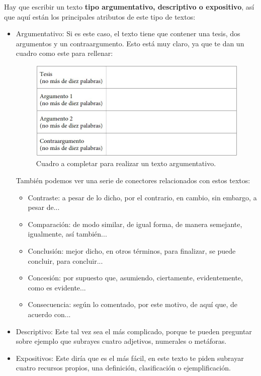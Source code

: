 \documentclass[arial,a4paper,print]{article}
\begin{document}
Hay que escribir un texto \textbf{tipo argumentativo, descriptivo o expositivo}, así que aquí están los principales atributos de este tipo de textos:
\begin{itemize}

\item Argumentativo: Si es este caso, el texto tiene que contener una tesis, dos argumentos y un contraargumento. Esto está muy claro, ya que te dan un cuadro como este para rellenar:
\begin{figure}[H]
	\centering
	\includegraphics[width=0.7\linewidth]{figures/cuadro_argumentos}
	\caption{Cuadro a completar para realizar un texto argumentativo. }
	\label{fig:cuadroargumentos}
\end{figure}

También podemos ver una serie de conectores relacionados con estos textos:
\begin{itemize}
\item Contraste: a pesar de lo dicho, por el contrario, en cambio, sin embargo, a pesar de...
\item Comparación: de modo similar, de igual forma, de manera semejante, igualmente, así también...
\item Conclusión: mejor dicho, en otros términos, para finalizar, se puede concluir, para concluir...
\item Concesión: por supuesto que, asumiendo, ciertamente, evidentemente, como es evidente...
\item Consecuencia: según lo comentado, por este motivo, de aquí que, de acuerdo con...
\end{itemize}

\item Descriptivo: Este tal vez sea el más complicado, porque te pueden preguntar sobre ejemplo que subrayes cuatro adjetivos, numerales o metáforas. 

\item Expositivos: Este diría que es el más fácil, en este texto te piden subrayar cuatro recursos propios, una definición, clasificación o ejemplificación.
\end{itemize}
\end{document}
